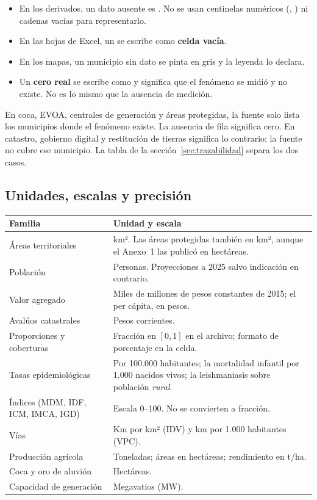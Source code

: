 \documentclass[11pt,a4paper]{article}
\begin{document}
\begin{itemize}[leftmargin=*, itemsep=2pt]
  \item En los derivados, un dato ausente es . No se usan centinelas
    numéricos (, ) ni cadenas vacías para representarlo.
  \item En las hojas de Excel, un  se escribe como \textbf{celda vacía}.
  \item En los mapas, un municipio sin dato se pinta en gris  y la
    leyenda lo declara.
  \item Un \textbf{cero real} se escribe como  y significa que el fenómeno
    se midió y no existe. No es lo mismo que la ausencia de medición.
\end{itemize}

\begin{advertencia}[title={Dónde el cero y el vacío se confunden con facilidad}]
En coca, EVOA, centrales de generación y áreas protegidas, la fuente solo lista
los municipios donde el fenómeno existe. La ausencia de fila significa cero. En
catastro, gobierno digital y restitución de tierras significa lo contrario: la
fuente no cubre ese municipio. La tabla de la sección~\ref{sec:trazabilidad}
separa los dos casos.
\end{advertencia}

\subsection{Unidades, escalas y precisión}

\noindent\begin{tabularx}{\linewidth}{>{\RaggedRight\arraybackslash}p{4.3cm} >{\RaggedRight\arraybackslash}X}
\toprule
\textbf{Familia} & \textbf{Unidad y escala} \\
\midrule
Áreas territoriales & km². Las áreas protegidas también en km², aunque el Anexo~1 las publicó en hectáreas. \\
Población & Personas. Proyecciones a 2025 salvo indicación en contrario. \\
Valor agregado & Miles de millones de pesos constantes de 2015; el per cápita, en pesos. \\
Avalúos catastrales & Pesos corrientes. \\
Proporciones y coberturas & Fracción en $[0,1]$ en el archivo; formato de porcentaje en la celda. \\
Tasas epidemiológicas & Por 100.000 habitantes; la mortalidad infantil por 1.000 nacidos vivos; la leishmaniasis sobre población \emph{rural}. \\
Índices (MDM, IDF, ICM, IMCA, IGD) & Escala 0--100. No se convierten a fracción. \\
Vías & Km por km² (IDV) y km por 1.000 habitantes (VPC). \\
Producción agrícola & Toneladas; áreas en hectáreas; rendimiento en t/ha. \\
Coca y oro de aluvión & Hectáreas. \\
Capacidad de generación & Megavatios (MW). \\
\bottomrule
\end{tabularx}
\end{document}
